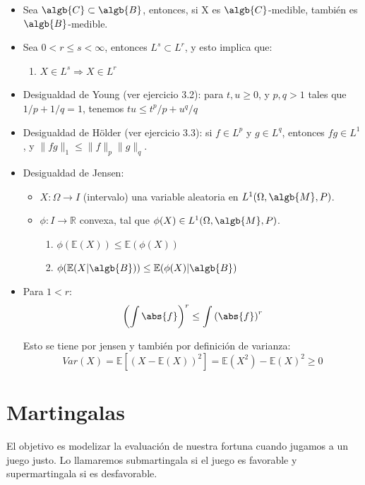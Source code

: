 \documentclass{apuntes}
\begin{document}
\begin{itemize}
\item Sea $\algb{C} \subset \algb{B}$, entonces, si X es $\algb{C}$-medible, también es $\algb{B}$-medible.

\item Sea $0<r\leq s<\infty$, entonces $L^s \subset L^r$, y esto implica que:
\begin{enumerate}
\item  $X \in L^s \Rightarrow X \in L^r$
\end{enumerate}

\item Desigualdad de Young (ver ejercicio 3.2): para $t, u \ge 0$, y $p,q > 1$ tales que $1/p + 1/q =1$, tenemos $tu \le t^p/ p + u^q/ q$
\item Desigualdad de Hölder (ver ejercicio 3.3): si $f\in L^p$ y $g\in L^q$, entonces $fg\in L^1$, y $\|fg\|_1 \le \|f\|_p\|g\|_q$.
\item Desigualdad de Jensen:
\begin{itemize}
\item $X: \Omega \rightarrow I$ (intervalo) una variable aleatoria en $L^1(\Omega, \algb{M},P)$.
\item $\phi: I \rightarrow \mathbb{R}$ convexa, tal que $\phi(X) \in L^1(\Omega,\algb{M},P)$.
\begin{enumerate}
\item $\phi(\mathbb{E}(X)) \leq \mathbb{E}(\phi(X))$
\item $\phi(\mathbb{E}(X|\algb{B})) \leq \mathbb{E}(\phi(X)|\algb{B})$

\end{enumerate}


\end{itemize}
\item Para $1<r$:
$$\left(\int \abs{f}\right)^r \leq\int \left( \abs{f} \right)^r$$

Esto se tiene por jensen y también por definición de varianza:
\[
Var(X)=\mathbb{E}[(X-\mathbb{E}(X))^2] = \mathbb{E}(X^2) - \mathbb{E}(X)^2 \geq 0
\]
\end{itemize}




\chapter{Martingalas}
El objetivo es modelizar la evaluación de nuestra fortuna cuando jugamos a un juego justo. Lo llamaremos submartingala si el juego es favorable y supermartingala si es desfavorable.
\end{document}
